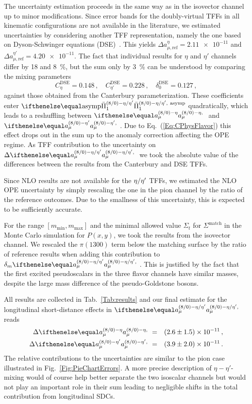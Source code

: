 The uncertainty estimation proceeds in the same way as in the isovector channel up to minor modifications. Since error bands for the doubly-virtual TFFs in all kinematic configurations are not available in the literature, we estimated uncertainties by considering another TFF representation, namely the one based on Dyson-Schwinger equations (DSE)~\cite{DSE}. This yields $\Delta a_{\mu, \text{ref}}^\eta = \num{2.11e-11}$ and $\Delta a_{\mu, \text{ref}}^{\eta'} = \num{4.20e-11}$. The fact that individual results for $\eta$ and $\eta'$ channels differ by \num{18} and \SI{8}{\percent}, but the sum only by \SI{3}{\percent} can be understood by comparing the mixing parameters
\begin{equation}
C_\eta^\text{DSE} = \num{0.148}\,, \quad C_{\eta'}^\text{DSE} = \num{0.228}\,, \quad \delta_0^\text{DSE} = \num{0.127}\,,
\label{Eq:CDSE}
\end{equation}
against those obtained from the Canterbury parameterization. These coefficients enter $\Pietaetap[\text{asymp}]$ quadratically, which leads to a reshuffling between $\aEta$ and $\aEtap$. Due to Eq.~(\ref{Eq:CPhysFlavor}) this effect drops out in the sum up to the anomaly correction affecting the OPE regime. As TFF contribution to the uncertainty on $\Delta \aEtaEtap$ we took the absolute value of the differences between the results from the Canterbury and DSE TFFs.

Since NLO results are not available for the ${\eta / \eta'}$ TFFs, we estimated the NLO OPE uncertainty by simply rescaling the one in the pion channel by the ratio of the reference outcomes. Due to the smallness of this uncertainty, this is expected to be sufficiently accurate.

For the range $[m_\text{min}, m_\text{max}]$ and the minimal allowed value $\Sigma_t$ for $\Sigma^\text{match}$ in the Monte Carlo simulation for $P(x,y)$, we took the results from the isovector channel. We rescaled the $\pi(1300)$ term below the matching surface by the ratio of reference results when adding this contribution to $\delta_m \aEtaEtap$. This is justified by the fact that the first excited pseudoscalars in the three flavor channels have similar masses, despite the large mass difference of the pseudo-Goldstone bosons.

All results are collected in Tab.~\ref{Tab:results} and our final estimate for the longitudinal short-distance effects in $\aEtaEtap$ reads
\begin{eqnarray}
\Delta \aEta & = & \num[separate-uncertainty]{2.6 \pm 1.5 e-11}\,, \nonumber \\
\Delta \aEtap & = & \num[separate-uncertainty]{3.9 \pm 2.0 e-11}\, .
\end{eqnarray}
The relative contributions to the uncertainties are similar to the pion case illustrated in Fig.~\ref{Fig:PieChartErrors}. A more precise description of $\eta-\eta'$-mixing would of course help better separate the two isoscalar channels but would not play an important role in their sum leading to negligible shifts in the total contribution from longitudinal SDCs.

